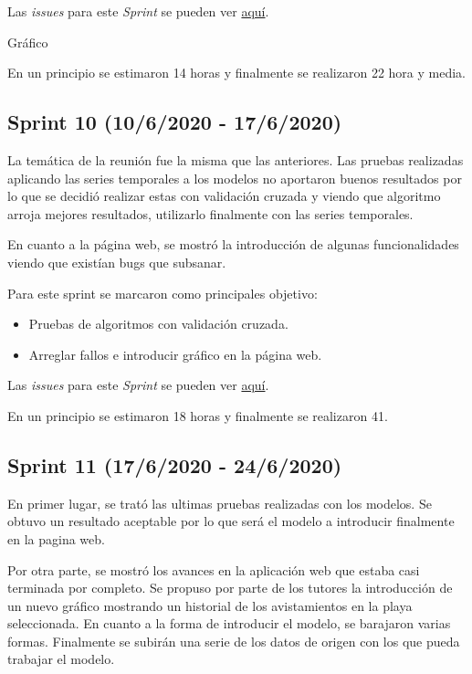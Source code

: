 Las \emph{issues} para este \emph{Sprint} se pueden ver \href{https://github.com/psnti/TFG-Pablo-Santidrian-Tudanca/milestone/9}{aquí}.

Gráfico

En un principio se estimaron 14 horas y finalmente se realizaron 22 hora y media.

\subsection{Sprint 10 (10/6/2020 - 17/6/2020)}\label{Sprint-10}

La temática de la reunión fue la misma que las anteriores. Las pruebas realizadas aplicando las series temporales a los modelos no aportaron buenos resultados por lo que se decidió realizar estas con validación cruzada y viendo que algoritmo arroja mejores resultados, utilizarlo finalmente con las series temporales.

En cuanto a la página web, se mostró la introducción de algunas funcionalidades viendo que existían bugs que subsanar.

Para este sprint se marcaron como principales objetivo:
\begin{itemize}
	\item Pruebas de algoritmos con validación cruzada.
	\item Arreglar fallos e introducir gráfico en la página web.
\end{itemize} 

Las \emph{issues} para este \emph{Sprint} se pueden ver \href{https://github.com/psnti/TFG-Pablo-Santidrian-Tudanca/milestone/10}{aquí}.


En un principio se estimaron 18 horas y finalmente se realizaron 41.

\subsection{Sprint 11 (17/6/2020 - 24/6/2020)}\label{Sprint-11}

En primer lugar, se trató las ultimas pruebas realizadas con los modelos. Se obtuvo un resultado aceptable por lo que será el modelo a introducir finalmente en la pagina web. 

Por otra parte, se mostró los avances en la aplicación web que estaba casi terminada por completo. Se propuso por parte de los tutores la introducción de un nuevo gráfico mostrando un historial de los avistamientos en la playa seleccionada. En cuanto a la forma de introducir el modelo, se barajaron varias formas. Finalmente se subirán una serie de los datos de origen con los que pueda trabajar el modelo.

